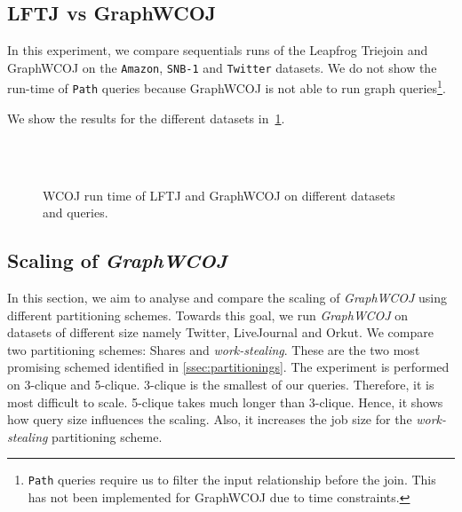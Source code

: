 \subsection{\textsc{LFTJ} vs GraphWCOJ} \label{subsec:lftj-vs-graphWCOJ}

In this experiment, we compare sequentials runs of the Leapfrog Triejoin and GraphWCOJ
on the \texttt{Amazon}, \texttt{SNB-1} and \texttt{Twitter} datasets.
We do not show the run-time of \texttt{Path} queries because GraphWCOJ is not able to run
graph queries\footnote{\texttt{Path} queries require us to filter the input relationship before
the join. This has not been implemented for GraphWCOJ due to time constraints.}.

We show the results for the different datasets in~\cref{fig:lftj-graphWCOJ}.


\begin{figure}
    \subfloat[Amazon-0302]{}
    \subfloat[Amazon-0601]{
      
      
    }\\
    \subfloat[SNB-1]{
    
    
    }\\
    \subfloat[]{
    
%    
    }
    \caption{WCOJ run time of \textsc{LFTJ} and GraphWCOJ on different datasets and queries.}
    \label{fig:lftj-graphWCOJ}
\end{figure}

\subsection{Scaling of \textit{Graph\textsc{WCOJ}}} \label{subsec:scaling-graphWCOJ}

In this section, we aim to analyse and compare the scaling of \textit{Graph\textsc{WCOJ}} using different
partitioning schemes.
Towards this goal, we run \textit{Graph\textsc{WCOJ}} on datasets of different size namely Twitter,
LiveJournal and Orkut.
We compare two partitioning schemes: Shares and \textit{work-stealing}.
These are the two most promising schemed identified in \cref{ssec:partitionings}.
The experiment is performed on 3-clique and 5-clique.
3-clique is the smallest of our queries.
Therefore, it is most difficult to scale.
5-clique takes much longer than 3-clique.
Hence, it shows how query size influences the scaling.
Also, it increases the job size for the \textit{work-stealing} partitioning scheme.

